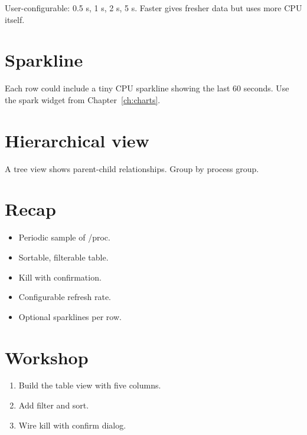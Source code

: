 User-configurable: 0.5 s, 1 s, 2 s, 5 s. Faster gives
fresher data but uses more CPU itself.

\section{Sparkline}

Each row could include a tiny CPU sparkline showing the
last 60 seconds. Use the spark widget from
Chapter~\ref{ch:charts}.

\section{Hierarchical view}

A tree view shows parent-child relationships. Group by
process group.

\section{Recap}

\begin{recap}
\begin{itemize}[leftmargin=*]
  \item Periodic sample of /proc.
  \item Sortable, filterable table.
  \item Kill with confirmation.
  \item Configurable refresh rate.
  \item Optional sparklines per row.
\end{itemize}
\end{recap}

\section*{Workshop}

\begin{enumerate}[leftmargin=*]
  \item Build the table view with five columns.
  \item Add filter and sort.
  \item Wire kill with confirm dialog.
\end{enumerate}
